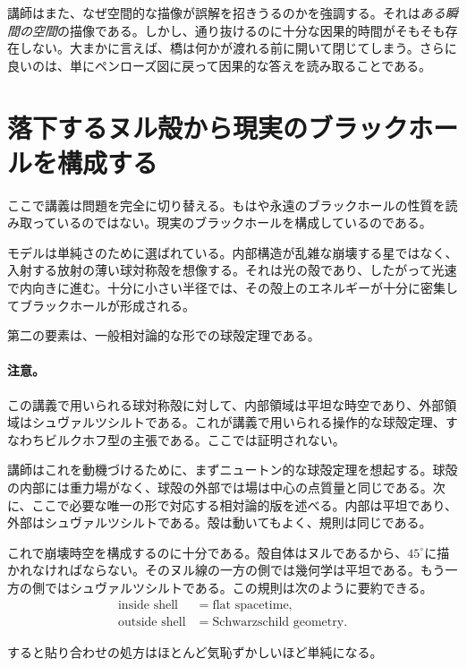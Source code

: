 講師はまた、なぜ空間的な描像が誤解を招きうるのかを強調する。それは\emph{ある瞬間の空間}の描像である。しかし、通り抜けるのに十分な因果的時間がそもそも存在しない。大まかに言えば、橋は何かが渡れる前に開いて閉じてしまう。さらに良いのは、単にペンローズ図に戻って因果的な答えを読み取ることである。

\section{落下するヌル殻から現実のブラックホールを構成する}

ここで講義は問題を完全に切り替える。もはや永遠のブラックホールの性質を読み取っているのではない。現実のブラックホールを構成しているのである。

モデルは単純さのために選ばれている。内部構造が乱雑な崩壊する星ではなく、入射する放射の薄い球対称殻を想像する。それは光の殻であり、したがって光速で内向きに進む。十分に小さい半径では、その殻上のエネルギーが十分に密集してブラックホールが形成される。

第二の要素は、一般相対論的な形での球殻定理である。

\paragraph{注意。} この講義で用いられる球対称殻に対して、内部領域は平坦な時空であり、外部領域はシュヴァルツシルトである。これが講義で用いられる操作的な球殻定理、すなわちビルクホフ型の主張である。ここでは証明されない。

講師はこれを動機づけるために、まずニュートン的な球殻定理を想起する。球殻の内部には重力場がなく、球殻の外部では場は中心の点質量と同じである。次に、ここで必要な唯一の形で対応する相対論的版を述べる。内部は平坦であり、外部はシュヴァルツシルトである。殻は動いてもよく、規則は同じである。

これで崩壊時空を構成するのに十分である。殻自体はヌルであるから、\(45^\circ\)に描かれなければならない。そのヌル線の一方の側では幾何学は平坦である。もう一方の側ではシュヴァルツシルトである。この規則は次のように要約できる。
\begin{equation}
\begin{aligned}
\text{inside shell} &= \text{flat spacetime},\\
\text{outside shell} &= \text{Schwarzschild geometry}.
\end{aligned}
\end{equation}

すると貼り合わせの処方はほとんど気恥ずかしいほど単純になる。

